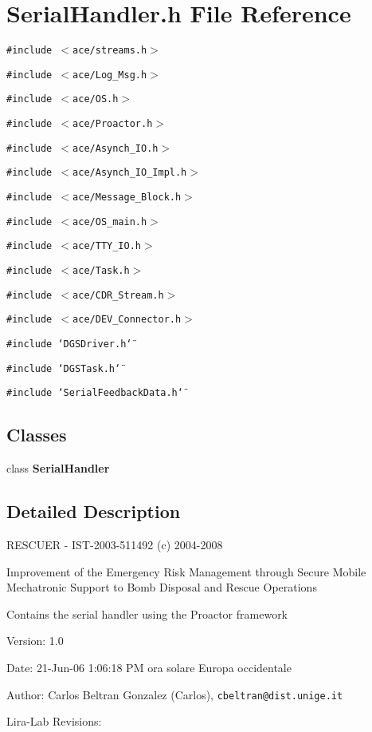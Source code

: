 \section{Serial\-Handler.h File Reference}
\label{SerialHandler_8h}
{\tt \#include $<$ace/streams.h$>$}\par
{\tt \#include $<$ace/Log\_\-Msg.h$>$}\par
{\tt \#include $<$ace/OS.h$>$}\par
{\tt \#include $<$ace/Proactor.h$>$}\par
{\tt \#include $<$ace/Asynch\_\-IO.h$>$}\par
{\tt \#include $<$ace/Asynch\_\-IO\_\-Impl.h$>$}\par
{\tt \#include $<$ace/Message\_\-Block.h$>$}\par
{\tt \#include $<$ace/OS\_\-main.h$>$}\par
{\tt \#include $<$ace/TTY\_\-IO.h$>$}\par
{\tt \#include $<$ace/Task.h$>$}\par
{\tt \#include $<$ace/CDR\_\-Stream.h$>$}\par
{\tt \#include $<$ace/DEV\_\-Connector.h$>$}\par
{\tt \#include \char`\"{}DGSDriver.h\char`\"{}}\par
{\tt \#include \char`\"{}DGSTask.h\char`\"{}}\par
{\tt \#include \char`\"{}Serial\-Feedback\-Data.h\char`\"{}}\par
\subsection*{Classes}
\begin{CompactItemize}
\item 
class {\bf Serial\-Handler}
\end{CompactItemize}


\subsection{Detailed Description}
RESCUER - IST-2003-511492 (c) 2004-2008

Improvement of the Emergency Risk Management through Secure Mobile Mechatronic Support to Bomb Disposal and Rescue Operations

Contains the serial handler using the Proactor framework \begin{Desc}
\item[Version:]1.0 \end{Desc}
\begin{Desc}
\item[Date:]21-Jun-06 1:06:18 PM ora solare Europa occidentale \end{Desc}
\begin{Desc}
\item[Author:]Carlos Beltran Gonzalez (Carlos), {\tt cbeltran@dist.unige.it} 

Lira-Lab Revisions:\end{Desc}

